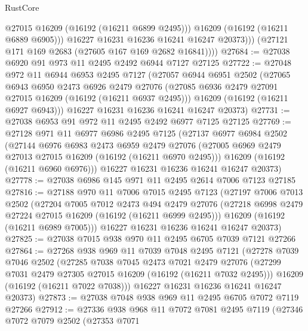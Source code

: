 \begin{lexlean}{RustCore}
\begin{coremodule}
                  @27015
                  @16209
                  (@16192 (@16211 @6899 @2495)))
                @16209
                (@16192 (@16211 @6889 @6905)))
              @16227
              @16231
              @16236
              @16241
              @16247
              @20373)))
        (@27121 @171 @169 @2683 (@27605 @167 @169 @2682 @16841))))
@27684 := @27038 @6920 @91 @973 @11 @2495 @2492 @6944 @7127 @27125
@27722 := @27048
    @972
    @11
    @6944
    @6953
    @2495
    @7127
    (@27057
      @6944
      @6951
      @2502
      (@27065
        @6943
        @6950
        @2473
        @6926
        @2479
        @27076
        (@27085 @6936 @2479 @27091 @27015 @16209 (@16192 (@16211 @6937 @2495)))
        @16209
        (@16192 (@16211 @6927 @6943)))
      @16227
      @16231
      @16236
      @16241
      @16247
      @20373)
@27731 := @27038 @6953 @91 @972 @11 @2495 @2492 @6977 @7125 @27125
@27769 := @27128
    @971
    @11
    @6977
    @6986
    @2495
    @7125
    (@27137
      @6977
      @6984
      @2502
      (@27144
        @6976
        @6983
        @2473
        @6959
        @2479
        @27076
        (@27005 @6969 @2479 @27013 @27015 @16209 (@16192 (@16211 @6970 @2495)))
        @16209
        (@16192 (@16211 @6960 @6976)))
      @16227
      @16231
      @16236
      @16241
      @16247
      @20373)
@27778 := @27038 @6986 @145 @971 @11 @2495 @2614 @7006 @7123 @27185
@27816 := @27188
    @970
    @11
    @7006
    @7015
    @2495
    @7123
    (@27197
      @7006
      @7013
      @2502
      (@27204
        @7005
        @7012
        @2473
        @494
        @2479
        @27076
        (@27218 @6998 @2479 @27224 @27015 @16209 (@16192 (@16211 @6999 @2495)))
        @16209
        (@16192 (@16211 @6989 @7005)))
      @16227
      @16231
      @16236
      @16241
      @16247
      @20373)
@27825 := @27038 @7015 @938 @970 @11 @2495 @6705 @7039 @7121 @27266
@27864 := @27268
    @938
    @969
    @11
    @7039
    @7048
    @2495
    @7121
    (@27278
      @7039
      @7046
      @2502
      (@27285
        @7038
        @7045
        @2473
        @7021
        @2479
        @27076
        (@27299 @7031 @2479 @27305 @27015 @16209 (@16192 (@16211 @7032 @2495)))
        @16209
        (@16192 (@16211 @7022 @7038)))
      @16227
      @16231
      @16236
      @16241
      @16247
      @20373)
@27873 := @27038 @7048 @938 @969 @11 @2495 @6705 @7072 @7119 @27266
@27912 := @27336
    @938
    @968
    @11
    @7072
    @7081
    @2495
    @7119
    (@27346
      @7072
      @7079
      @2502
      (@27353
        @7071

\end{coremodule}
\end{lexlean}
